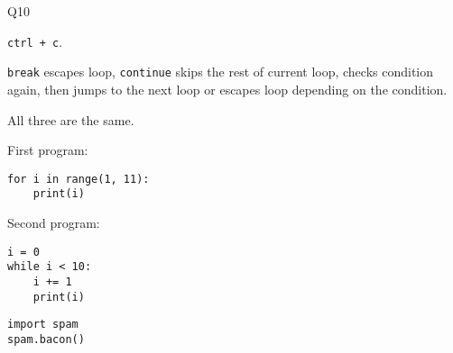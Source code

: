 \documentclass[a4paper,11pt]{scrartcl}
\begin{document}
\begin{labeling}{Q10}
  \item[Q10]
  \lstinline{ctrl + c}.

  \item[Q11]
  \lstinline{break} escapes loop, \lstinline{continue} skips the rest of current loop, checks condition again, then jumps to the next loop or escapes loop depending on the condition.

  \item[Q12]
  All three are the same.

  \item[Q13]
  First program:
  \begin{lstlisting}
for i in range(1, 11):
    print(i)
  \end{lstlisting}
  Second program:
  \begin{lstlisting}
i = 0
while i < 10:
    i += 1
    print(i)
  \end{lstlisting}

  \item[Q14]
  \begin{lstlisting}
import spam
spam.bacon()
  \end{lstlisting}
\end{labeling}
\end{document}
